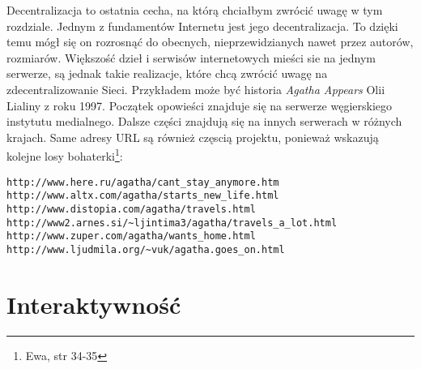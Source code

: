 \documentclass[a4paper,12pt,twoside]{article}
\begin{document}
Decentralizacja to ostatnia cecha, na którą chciałbym zwrócić uwagę
w tym rozdziale. Jednym z fundamentów Internetu jest jego decentralizacja.
To dzięki temu mógł się on rozrosnąć do obecnych, nieprzewidzianych
nawet przez autorów, rozmiarów. Większość dzieł i serwisów internetowych
mieści sie na jednym serwerze, są jednak takie realizacje, które chcą
zwrócić uwagę na zdecentralizowanie Sieci. Przykładem może być historia
\textit{Agatha Appears} Olii Lialiny z roku 1997. Początek opowieści
znajduje się na serwerze węgierskiego instytutu medialnego. Dalsze części
znajdują się na innych serwerach w różnych krajach. Same adresy URL są
również częscią projektu, ponieważ wskazują kolejne losy
bohaterki\footnote{Ewa, str 34-35}:
\begin{verbatim}
http://www.here.ru/agatha/cant_stay_anymore.htm
http://www.altx.com/agatha/starts_new_life.html
http://www.distopia.com/agatha/travels.html
http://www2.arnes.si/~ljintima3/agatha/travels_a_lot.html
http://www.zuper.com/agatha/wants_home.html
http://www.ljudmila.org/~vuk/agatha.goes_on.html
\end{verbatim}



\section{Interaktywność}

\end{document}
